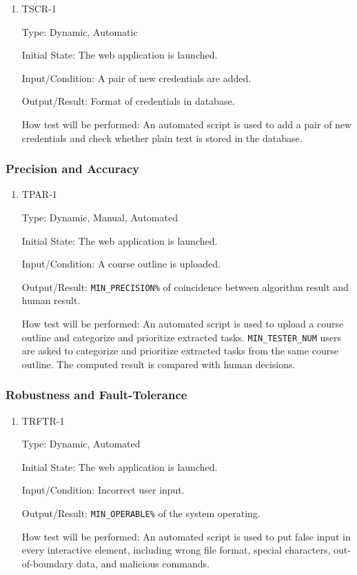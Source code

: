 \documentclass[12pt, titlepage]{article}
\begin{document}
\begin{enumerate}
\item{TSCR-1\\}\label{TSCR-1}

Type: Dynamic, Automatic
					
Initial State: The web application is launched.
					
Input/Condition: A pair of new credentials are added.
					
Output/Result: Format of credentials in database.
					
How test will be performed: An automated script is used to add a pair of new credentials and check whether plain text is stored in the database.

\end{enumerate}
\subsubsection{Precision and Accuracy}

\begin{enumerate}
\item{TPAR-1\\}\label{TPAR-1}

Type: Dynamic, Manual, Automated
					
Initial State: The web application is launched.
					
Input/Condition: A course outline is uploaded.
					
Output/Result: \texttt{MIN\_PRECISION\%} of coincidence between algorithm result and human result.
					
How test will be performed: An automated script is used to upload a course outline and categorize and prioritize extracted tasks. \texttt{MIN\_TESTER\_NUM} users are asked to categorize and prioritize extracted tasks from the same course outline.  The computed result is compared with human decisions.

\end{enumerate}

\subsubsection{Robustness and Fault-Tolerance}

\begin{enumerate}
\item{TRFTR-1\\}\label{TRFTR-1}

Type: Dynamic, Automated
					
Initial State: The web application is launched.
					
Input/Condition: Incorrect user input.
					
Output/Result: \texttt{MIN\_OPERABLE\%} of the system operating.
					
How test will be performed: An automated script is used to put false input in every interactive element, including wrong file format, special characters, out-of-boundary data, and malicious commands.
\end{enumerate}
\end{document}
